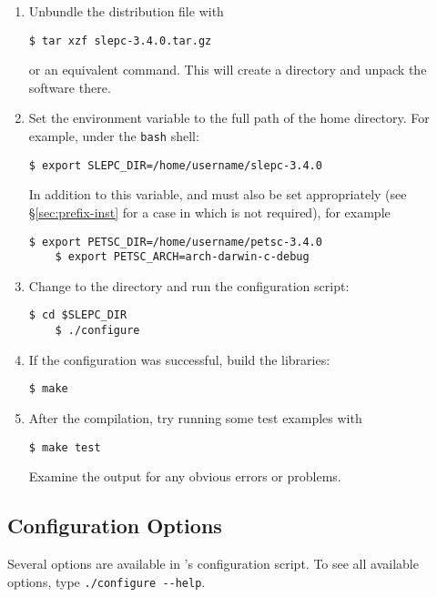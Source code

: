 \begin{enumerate}
	\item Unbundle the distribution file with 
	\begin{Verbatim}[fontsize=\small]
	$ tar xzf slepc-3.4.0.tar.gz
	\end{Verbatim}
        or an equivalent command. This will create a directory and unpack the software there.
	\item Set the environment variable  to the full path of the \slepc home directory. For example, under the \texttt{bash} shell:
	\begin{Verbatim}[fontsize=\small]
	$ export SLEPC_DIR=/home/username/slepc-3.4.0
	\end{Verbatim}
	In addition to this variable,  and  must also be set appropriately (see \S\ref{sec:prefix-inst} for a case in which  is not required), for example
	\begin{Verbatim}[fontsize=\small]
	$ export PETSC_DIR=/home/username/petsc-3.4.0
	$ export PETSC_ARCH=arch-darwin-c-debug
	\end{Verbatim}
	\item\label{step-config} Change to the \slepc directory and run the configuration script:
	\begin{Verbatim}[fontsize=\small]
	$ cd $SLEPC_DIR
	$ ./configure
	\end{Verbatim}
	\item If the configuration was successful, build the libraries:
	\begin{Verbatim}[fontsize=\small]
	$ make
	\end{Verbatim}
	\item After the compilation, try running some test examples with
	\begin{Verbatim}[fontsize=\small]
	$ make test
	\end{Verbatim}
        Examine the output for any obvious errors or problems.
\end{enumerate}
	
\subsection{Configuration Options}
\label{sec:opt-inst}

Several options are available in \slepc's configuration script. To see all available options, type \Verb!./configure --help!.

